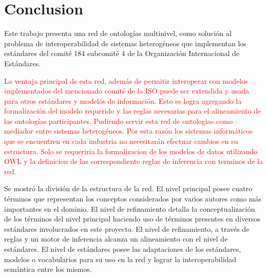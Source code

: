\documentclass[journal]{IEEEtran}
\begin{document}




\section{Conclusion}

Este trabajo presenta una red de ontolog\'ias multinivel, como soluci\'on al problema de interoperabilidad de sistemas heterog\'eneos que implementan los est\'andares del comit\'e 184 subcomit\'e 4 de la Organizaci\'on Internacional de Est\'andares. 

\textcolor{red}{La ventaja principal de esta red, adem\'as de permitir interoperar con modelos implementados del mencionado comit\'e de la ISO puede ser extendida y usada para otros est\'andares y modelos de informaci\'on. Esto se logra agregando la formalizaci\'on del modelo requerido y las reglas necesarias para el alineamiento de las ontolog\'ias participantes. Pudiendo servir esta red de ontologias como mediador entre sistemas heterog\'eneos. Por esta raz\'on los sistemas inform\'aticos que se encuentren en cada industria no necesitar\'an efectuar cambios en su estructura. Solo se requeriria la formalizacion de los modelos de datos utilizando OWL y la definicion de las correspondiente reglas de inferencia con terminos de la red.}

Se mostr\'o la divisi\'on de la estructura de la red. El nivel principal posee cuatro t\'erminos que representan los conceptos considerados por varios autores como m\'as importantes en el dominio. El nivel de refinamiento detalla la conceptualizaci\'on de los t\'erminos del nivel principal haciendo uso de t\'erminos presentes en diversos est\'andares involucrados en este proyecto. El nivel de refinamiento, a trav\'es de reglas y un motor de inferencia alcanza un alineamiento con el nivel de est\'andares. El nivel de est\'andares posee las adaptaciones de los est\'andares, modelos o vocabularios para su uso en la red y lograr la interoperabilidad sem\'antica entre los mismos. 
\end{document}

